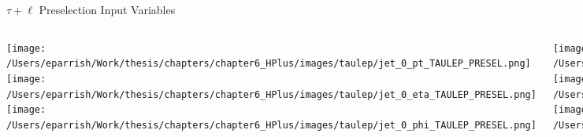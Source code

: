 \documentclass[aspectratio=169,xcolor=table]{beamer}
\begin{document}
    \begin{frame}[t]{$\tau+\ell$ Preselection Input Variables}
      \begin{columns}[t]
          \texttt{[image: /Users/eparrish/Work/thesis/chapters/chapter6\_HPlus/images/taulep/jet\_0\_pt\_TAULEP\_PRESEL.png]}
          \texttt{[image: /Users/eparrish/Work/thesis/chapters/chapter6\_HPlus/images/taulep/jet\_0\_eta\_TAULEP\_PRESEL.png]}
          \texttt{[image: /Users/eparrish/Work/thesis/chapters/chapter6\_HPlus/images/taulep/jet\_0\_phi\_TAULEP\_PRESEL.png]}

          \texttt{[image: /Users/eparrish/Work/thesis/chapters/chapter6\_HPlus/images/taulep/lep\_0\_pt\_TAULEP\_PRESEL.png]}
          \texttt{[image: /Users/eparrish/Work/thesis/chapters/chapter6\_HPlus/images/taulep/lep\_0\_eta\_TAULEP\_PRESEL.png]}
          \texttt{[image: /Users/eparrish/Work/thesis/chapters/chapter6\_HPlus/images/taulep/lep\_0\_phi\_TAULEP\_PRESEL.png]}

          \texttt{[image: /Users/eparrish/Work/thesis/chapters/chapter6\_HPlus/images/taulep/el\_0\_pt\_TAULEP\_PRESEL.png]}
          \texttt{[image: /Users/eparrish/Work/thesis/chapters/chapter6\_HPlus/images/taulep/el\_0\_eta\_TAULEP\_PRESEL.png]}
          \texttt{[image: /Users/eparrish/Work/thesis/chapters/chapter6\_HPlus/images/taulep/el\_0\_phi\_TAULEP\_PRESEL.png]}

          \texttt{[image: /Users/eparrish/Work/thesis/chapters/chapter6\_HPlus/images/taulep/mu\_0\_pt\_TAULEP\_PRESEL.png]}
          \texttt{[image: /Users/eparrish/Work/thesis/chapters/chapter6\_HPlus/images/taulep/mu\_0\_eta\_TAULEP\_PRESEL.png]}
          \texttt{[image: /Users/eparrish/Work/thesis/chapters/chapter6\_HPlus/images/taulep/mu\_0\_phi\_TAULEP\_PRESEL.png]}

      \end{columns}
      \end{frame}
\end{document}
